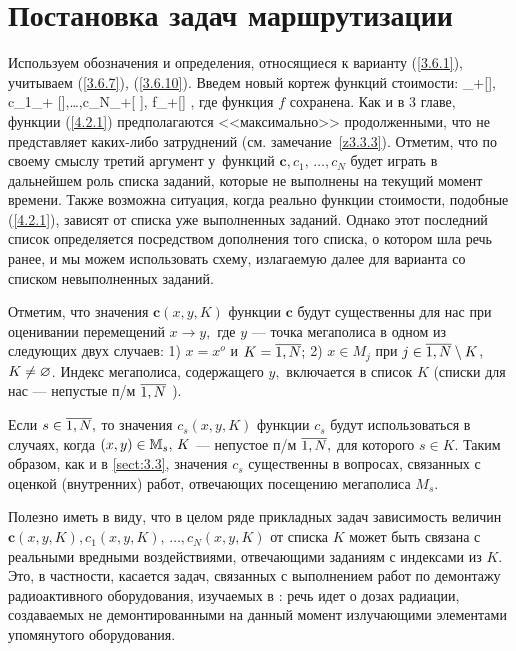 
\section{
  Постановка задач маршрутизации
}
\label{sect:4.2}
\setcounter{equation}{0}

Используем обозначения и определения,
относящиеся к варианту
(\ref{3.6.1}),
учитываем (\ref{3.6.7}), (\ref{3.6.10}).
Введем новый кортеж функций стоимости:
\bfn
  \label{4.2.1}
  \in \car_+[\bbx\times \bbx\times {}], c_1\in \car_+
  [\bbx\times \bbx\times {}],\ldots,c_N\in \car_+[\bbx\times
  \bbx\times {}], f\in \car_+[\bbx]
  ,
\efn
где функция $f$ сохранена.
Как и в 3 главе,
функции (\ref{4.2.1})
предполагаются <<максимально>> продолженными,
что не представляет каких-либо затруднений
(см. замечание~\ref{z3.3.3}).
Отметим, что по своему смыслу третий аргумент у~функций
$\mathbf{c}, c_1,\,\ldots,c_N$ будет
играть в дальнейшем роль списка заданий,
которые  не выполнены на текущий момент времени.
Также возможна ситуация, когда реально функции стоимости,
подобные (\ref{4.2.1}),
зависят  от списка уже выполненных заданий.
Однако этот последний список определяется посредством дополнения того списка,
о котором шла речь ранее, и мы можем использовать схему,
излагаемую далее для варианта со списком невыполненных заданий.

Отметим,
что значения $\mathbf{c}(x,y,K)$
функции $\mathbf{c}$
будут существенны для нас при оценивании перемещений
$x\rightarrow y,$ где $y$ ---
точка мегаполиса в одном из следующих двух случаев:
1) $x= x^o$ и $K = \ov{1,N};$
2) $x\in M_j$ при $j\in \ov{1,N}\sm K$, $K\neq \varnothing$.
Индекс мегаполиса,
содержащего $y,$ включается в список $K$
(списки для нас --- непустые п/м $\ov{1,N}$ ).

Если $s\in \ov{1,N},$
то значения $c_s(x,y,K)$
функции $c_s$ будут
использоваться в случаях, когда $(x,y)\in {\mathbb M}_s,\, K$ ---
непустое п/м
$\ov{1,N},$
для которого $s\in K.$
Таким образом, как и в \ref{sect:3.3},
значения $c_s$ существенны в вопросах,
связанных с оценкой
(внутренних)
работ,
отвечающих посещению мегаполиса $M_s.$

Полезно иметь в виду,
что в целом ряде прикладных задач зависимость величин
$\mathbf{c}(x,y,K), c_1(x,y,K),\,\ldots,c_N(x,y,K)$
от списка $K$
может быть связана с реальными вредными воздействиями,
отвечающими заданиям с индексами из $K.$
Это, в частности, касается задач, связанных с выполнением
работ по демонтажу радиоактивного оборудования,
изучаемых в \cite{Cha2`}:
речь идет о дозах радиации,
создаваемых не демонтированными на данный момент
излучающими элементами упомянутого оборудования.

